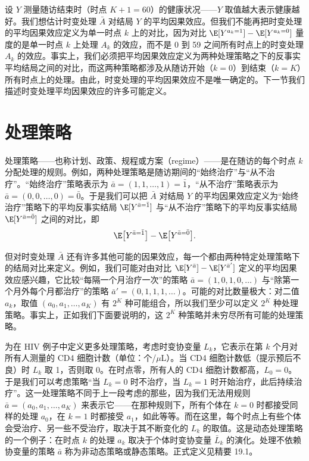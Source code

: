 
设 $Y$ 测量随访结束时（时点 $K+1=60$）的健康状况——$Y$ 取值越大表示健康越好。我们想估计时变处理 $\bar{A}$ 对结局 $Y$ 的平均因果效应。但我们不能再把时变处理的平均因果效应定义为单一时点 $k$ 上的对比，因为对比 $\E[Y^{a_k=1}]-\E[Y^{a_k=0}]$ 量度的是单一时点 $k$ 上处理 $A_k$ 的效应，而不是 0 到 59 之间所有时点上的时变处理 $A_k$ 的效应。事实上，我们必须把平均因果效应定义为两种处理策略之下的反事实平均结局之间的对比，而这两种策略都涉及从随访开始（$k=0$）到结束（$k=K$）所有时点上的处理。由此，时变处理的平均因果效应不是唯一确定的。下一节我们描述时变处理平均因果效应的许多可能定义。


\section{处理策略}

处理策略——也称计划、政策、规程或方案（regime）——是在随访的每个时点 $k$ 分配处理的规则。例如，两种处理策略是随访期间的“始终治疗”与“从不治疗”。“始终治疗”策略表示为 $\bar{a}=(1,1,\ldots,1)=\bar{1}$，“从不治疗”策略表示为 $\bar{a}=(0,0,\ldots,0)=\bar{0}$。于是我们可以把 $\bar{A}$ 对结局 $Y$ 的平均因果效应定义为“始终治疗”策略下的平均反事实结局 $\E[Y^{\bar{a}=\bar{1}}]$ 与“从不治疗”策略下的平均反事实结局 $\E[Y^{\bar{a}=\bar{0}}]$ 之间的对比，即
\[
\E\bigl[Y^{\bar{a}=\bar{1}}\bigr]-\E\bigl[Y^{\bar{a}=\bar{0}}\bigr].
\]


但对时变处理 $\bar{A}$ 还有许多其他可能的因果效应，每一个都由两种特定处理策略下的结局对比来定义。例如，我们可能对由对比 $\E[Y^{\bar{a}}]-\E[Y^{\bar{a}'}]$ 定义的平均因果效应感兴趣，它比较“每隔一个月治疗一次”的策略 $\bar{a}=(1,0,1,0,\ldots)$ 与“除第一个月外每个月都治疗”的策略 $\bar{a}'=(0,1,1,1,\ldots)$。可能的对比数量极大：对二值 $a_k$，取值 $(a_0,a_1,\ldots,a_K)$ 有 $2^K$ 种可能组合，所以我们至少可以定义 $2^K$ 种处理策略。事实上，正如我们下面要说明的，这 $2^K$ 种策略并未穷尽所有可能的处理策略。


为在 HIV 例子中定义更多处理策略，考虑时变协变量 $L_k$，它表示在第 $k$ 个月对所有人测量的 CD4 细胞计数（单位：个/$\mu$L）。当 CD4 细胞计数低（提示预后不良）时 $L_k$ 取 1，否则取 0。在时点零，所有人的 CD4 细胞计数都高，$L_0=0$。于是我们可以考虑策略“当 $L_k=0$ 时不治疗，当 $L_k=1$ 时开始治疗，此后持续治疗”。这一处理策略不同于上一段考虑的那些，因为我们无法用规则 $\bar{a}=(a_0,a_1,\ldots,a_K)$ 来表示它——在那种规则下，所有个体在 $k=0$ 时都接受同样的处理 $a_0$，在 $k=1$ 时都接受 $a_1$，如此等等。而在这里，每个时点上有些个体会受治疗、另一些不受治疗，取决于其不断变化的 $L_k$ 的取值。这是动态处理策略的一个例子：在时点 $k$ 的处理 $a_k$ 取决于个体时变协变量 $\bar{L}_k$ 的演化。处理不依赖协变量的策略 $\bar{a}$ 称为非动态策略或静态策略。正式定义见精要 19.1。

